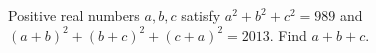 Positive real numbers $a,b,c$ satisfy $a^2+b^2+c^2=989$ and $(a+b)^2+(b+c)^2+(c+a)^2=2013$. Find $a+b+c$.
